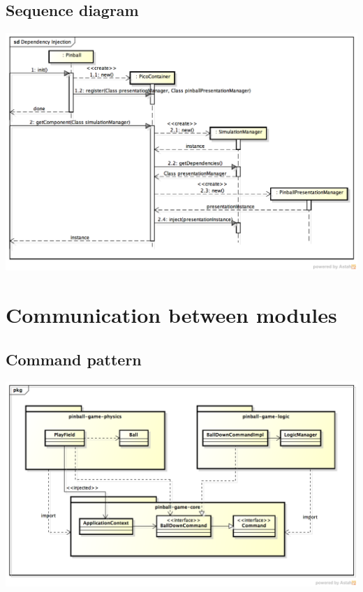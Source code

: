 \documentclass[fontsize=12pt,
               paper=a4,
               twoside=false,
               parskip=half,
               ]{scrartcl}
\begin{document}
\subsection{Sequence diagram}
\includegraphics[width=15.5cm]{./img/dependency-injection-sd.png}

\section{Communication between modules}
\subsection{Command pattern}
\includegraphics[width=15.5cm]{./img/command-pattern1.png}
\end{document}
